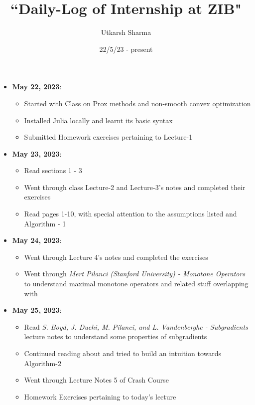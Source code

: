 \documentclass[a4paper,11pt,fleqn]{article}
\theoremstyle{plain}{\theorembodyfont{\rmfamily}%
\newtheorem{conjecture}[theorem]{Conjecture}}
\theoremstyle{plain}{\theorembodyfont{\rmfamily}%
\newtheorem{example}[theorem]{Example}}
\theoremstyle{plain}{\theorembodyfont{\rmfamily}%
\newtheorem{remark}[theorem]{Remark}}
\theoremstyle{plain}{\theorembodyfont{\rmfamily}%
\newtheorem{algorithm}[theorem]{Algorithm}}
\theoremstyle{plain}{\theorembodyfont{\rmfamily}%
\newtheorem{condition}[theorem]{Condition}}
\theoremstyle{plain}{\theorembodyfont{\rmfamily}%
\newtheorem{definition}[theorem]{Definition}}
\theoremstyle{plain}{\theorembodyfont{\rmfamily}
\newtheorem{fact}[theorem]{Fact}}
\theoremstyle{plain}{\theorembodyfont{\rmfamily}
\newtheorem{problem}[theorem]{Problem}}
\theoremstyle{plain}{\theorembodyfont{\rmfamily}
\newtheorem{notation}[theorem]{Notation}}
\theoremstyle{plain}{\theorembodyfont{\rmfamily}
\newtheorem{project}[theorem]{Project}}
\begin{document}
\title{``Daily-Log of Internship at ZIB"}
\author{Utkarsh Sharma}
\date{22/5/23 - present}
\maketitle 
\begin{itemize}
\item {\bf May 22, 2023}: 
\begin{itemize} 
\item Started with Class on Prox methods and non-smooth convex optimization
\item Installed Julia locally and learnt its basic syntax
\item Submitted Homework exercises pertaining to Lecture-1
\end{itemize}
\item {\bf May 23, 2023}:
\begin{itemize} 
\item Read \cite{drusvyatskiy_proximal} sections 1 - 3
\item Went through class Lecture-2 and Lecture-3's notes and completed their exercises
\item Read \cite{Johnstone2020projective} pages 1-10, with special attention to the assumptions listed and Algorithm - 1
\end{itemize}

\item {\bf May 24, 2023}:
\begin{itemize} 
\item Went through Lecture 4's notes and completed the exercises
\item Went through \textit{Mert Pilanci (Stanford University) - Monotone Operators} to understand maximal monotone operators and related stuff overlapping with \cite{Johnstone2020projective}
\end{itemize}

\item {\bf May 25, 2023}:
\begin{itemize} 
\item Read \textit{S. Boyd, J. Duchi, M. Pilanci, and L. Vandenberghe - Subgradients} lecture notes to understand some properties of subgradients
\item Continued reading about \cite{Johnstone2020projective} and tried to build an intuition towards Algorithm-2
\item Went through Lecture Notes 5 of Crash Course
\item Homework Exercises pertaining to today's lecture
\end{itemize}


\end{itemize}
\end{document}
